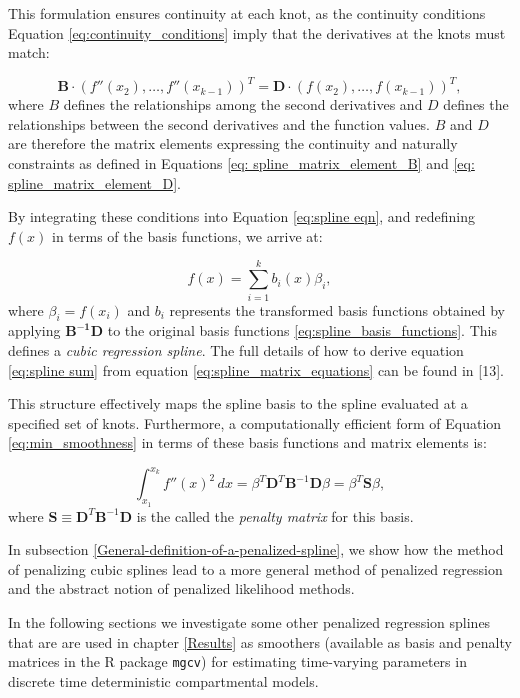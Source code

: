 \documentclass[
11pt, %
oneside, %
english, %
singlespacing, %
]{macthesis} %
\begin{document}
This formulation ensures continuity at each knot, as the continuity conditions Equation \ref{eq:continuity_conditions} imply that the derivatives at the knots must match:

\begin{equation}
\mathbf{B} \cdot (f''(x_2),\dots, f''(x_{k-1}))^{T} = \mathbf{D} \cdot (f(x_2),\dots, f(x_{k-1}))^{T},
\label{eq:spline_matrix_equations}
\end{equation}
where \(B\) defines the relationships among the second derivatives and \(D\) defines the relationships between the second derivatives and the function values. \(B\) and \(D\) are therefore the matrix elements expressing the continuity and naturally constraints as defined in Equations \ref{eq: spline_matrix_element_B} and \ref{eq: spline_matrix_element_D}.

By integrating these conditions into Equation \ref{eq:spline eqn}, and redefining \(f(x)\) in terms of the basis functions, we arrive at:

\begin{equation}
f(x) = \sum_{i=1}^{k}b_i(x)\beta_i,
\label{eq:spline sum}
\end{equation}
where \(\beta_i = f(x_i)\) and \(b_i\) represents the transformed basis functions obtained by applying \(\mathbf{B^{-1}D}\) to the original basis functions \ref{eq:spline_basis_functions}. This defines a \emph{cubic regression spline}. The full details of how to derive equation \ref{eq:spline sum} from equation \ref{eq:spline_matrix_equations} can be found in {[}13{]}.

This structure effectively maps the spline basis to the spline evaluated at a specified set of knots. Furthermore, a computationally efficient form of Equation \ref{eq:min_smoothness} in terms of these basis functions and matrix elements is:

\[
\int_{x_1}^{x_k} f''(x)^2 \, dx = \beta^T \mathbf{D}^T \mathbf{B}^{-1} \mathbf{D} \beta =  \beta^T \mathbf{S} \beta,
\]
where \(\mathbf{S} \equiv \mathbf{D}^T \mathbf{B}^{-1} \mathbf{D}\) is the called the \emph{penalty matrix} for this basis.

In subsection \ref{General-definition-of-a-penalized-spline}, we show how the method of penalizing cubic splines lead to a more general method of penalized regression and the abstract notion of penalized likelihood methods.

In the following sections we investigate some other penalized regression splines that are are used in chapter \ref{Results} as smoothers (available as basis and penalty matrices in the R package \texttt{mgcv}) for estimating time-varying parameters in discrete time deterministic compartmental models.
\end{document}
